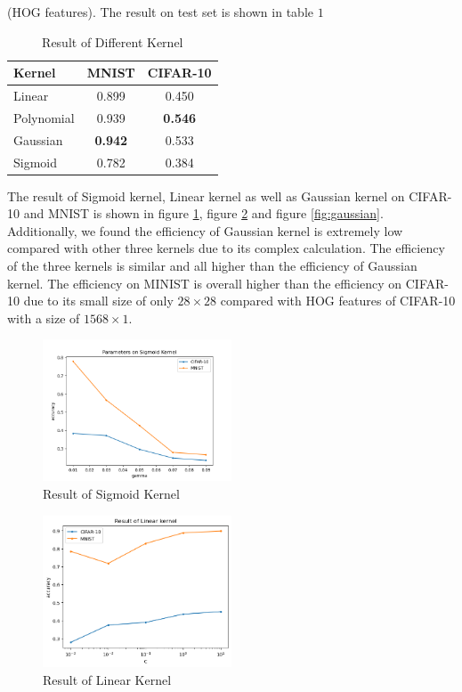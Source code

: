 \documentclass[twocolumn, a4paper]{article}
\begin{document}
(HOG features). The result on test set is shown in table $1$
\begin{table}[h!]
  \begin{center}
    \begin{tabular}{l|c|c} %
      \textbf{Kernel} & \textbf{MNIST} & \textbf{CIFAR-10}\\
      \hline
      Linear & 0.899 & 0.450\\
      Polynomial & 0.939 & \textbf{0.546}\\
      Gaussian & \textbf{0.942} & 0.533\\
      Sigmoid & 0.782 & 0.384\\
    \end{tabular}
    \caption{Result of Different Kernel}
  \end{center}
\end{table}
The result of Sigmoid kernel, Linear kernel as well as Gaussian kernel on CIFAR-10 and MNIST is shown in figure \ref{fig:sigmoid}, figure \ref{fig:linear} and figure \ref{fig:gaussian}. Additionally, we found the efficiency of Gaussian kernel is extremely low compared with other three kernels due to its complex calculation. The efficiency of the three kernels is similar and all higher than the efficiency of Gaussian kernel. The efficiency on MINIST is overall higher than the efficiency on CIFAR-10 due to its small size of only $28\times 28$ compared with HOG features of CIFAR-10 with a size of $1568\times 1$.
\begin{figure}[htb]
  \centering
  \includegraphics[width=0.5\textwidth]{Sigmoid.png}
  \caption{Result of Sigmoid Kernel}
  \label{fig:sigmoid}
\end{figure}
\begin{figure}[htb]
  \centering
  \includegraphics[width=0.5\textwidth]{Linear.png}
  \caption{Result of Linear Kernel}
  \label{fig:linear}
\end{figure}
\end{document}
